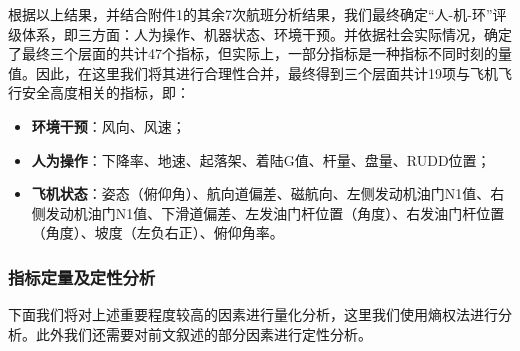 \documentclass{MathorCupModeling}
\begin{document}
	根据以上结果，并结合附件1的其余7次航班分析结果，我们最终确定“人-机-环”评级体系，即三方面：人为操作、机器状态、环境干预。并依据社会实际情况，确定了最终三个层面的共计47个指标，但实际上，一部分指标是一种指标不同时刻的量值。因此，在这里我们将其进行合理性合并，最终得到三个层面共计19项与飞机飞行安全高度相关的指标，即：
	\begin{itemize}\label{确定指标}
		\item \textbf{环境干预}：风向、风速；
		\item \textbf{人为操作}：下降率、地速、起落架、着陆G值、杆量、盘量、RUDD位置；
		\item \textbf{飞机状态}：姿态（俯仰角）、航向道偏差、磁航向、左侧发动机油门N1值、右侧发动机油门N1值、下滑道偏差、左发油门杆位置（角度）、右发油门杆位置（角度）、坡度（左负右正）、俯仰角率。
	\end{itemize}

	\subsubsection{指标定量及定性分析}
	下面我们将对上述重要程度较高的因素进行量化分析，这里我们使用熵权法进行分析。此外我们还需要对前文叙述的部分因素进行定性分析。
\end{document}
